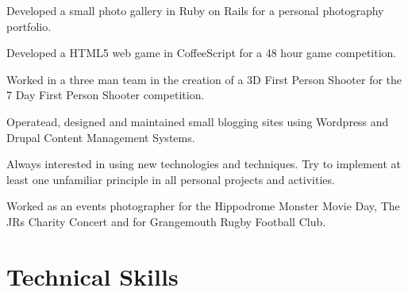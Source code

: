 \documentclass[11pt,a4paper]{article}
\renewenvironment{itemize}{
  \begin{list}{}{
    \setlength{\leftmargin}{1em}
    \setlength{\itemsep}{0.25em}
    \setlength{\parskip}{0pt}
    \setlength{\parsep}{0.25em}
    \renewcommand{\labelitemi}{$\bullet$}
  }
}{
  \end{list}
}
\begin{document}
\begin{itemize}
    \item Developed a small photo gallery in Ruby on Rails for a personal
        photography portfolio.
    \item Developed a HTML5 web game in CoffeeScript for a 48 hour game
        competition.
    \item Worked in a three man team in the creation of a 3D First Person Shooter
        for the 7 Day First Person Shooter competition.
    \item Operatead, designed and maintained small blogging sites using
        Wordpress and Drupal Content Management Systems.
    \item Always interested in using new technologies and techniques. Try to
        implement at least one unfamiliar principle in all personal projects and
        activities.
    \item Worked as an events photographer for the Hippodrome Monster Movie Day, The JRs Charity Concert and for Grangemouth Rugby Football Club.
\end{itemize}

\section*{Technical Skills}

\end{document}
